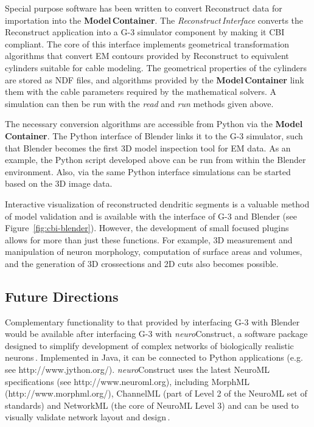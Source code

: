 \documentclass[12pt]{article}
\begin{document}
Special purpose software has been written to convert Reconstruct data
for importation into the {\bf Model\,Container}.  The {\it
  Reconstruct\,Interface} converts the Reconstruct application into a
G-3 simulator component by making it CBI compliant.
The core of this interface implements geometrical transformation
algorithms that convert EM contours provided by Reconstruct to
equivalent cylinders suitable for cable modeling.
The geometrical properties of the cylinders are stored as NDF files,
and algorithms provided by the {\bf Model\,Container} link them with
the cable parameters required by the mathematical solvers.  A
simulation can then be run with the {\it read} and {\it run} methods
given above.

The necessary conversion algorithms are accessible from Python via the
{\bf Model\,Container}.  The Python interface of Blender links it to the G-3
simulator, such that Blender becomes the first 3D model inspection
tool for EM data.  As an example, the Python script developed above
can be run from within the Blender environment.  Also, via the same
Python interface simulations can be started based on the 3D image
data.

Interactive visualization of reconstructed dendritic segments is a
valuable method of model validation and is available with the
interface of G-3 and Blender (see Figure~\ref{fig:cbi-blender}).
However, the development of small focused plugins allows for more than
just these functions. For example, 3D measurement and manipulation of
neuron morphology, computation of surface areas and volumes, and the
generation of 3D crossections and 2D cuts also becomes possible.

\subsection{Future Directions}

Complementary functionality to that provided by interfacing G-3 with
Blender would be available after interfacing G-3 with {\it
  neuro}Construct, a software package designed to simplify development
of complex networks of biologically realistic
neurons\,\cite{gleeson05:_build_networ_model}.  Implemented in Java,
it can be connected to Python applications (e.g. see
http://www.jython.org/).  {\it neuro}Construct uses the latest NeuroML
specifications (see http://www.neuroml.org), including MorphML
(http://www.morphml.org/), ChannelML (part of Level 2 of the NeuroML
set of standards) and NetworkML (the core of NeuroML Level 3) and can
be used to visually validate network layout and
design\,\cite{crook07:_morph}.
\end{document}
